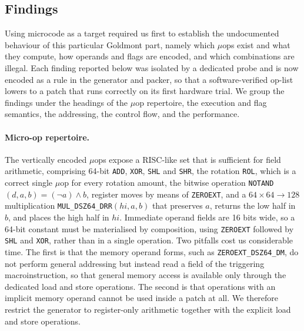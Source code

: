 \subsection{Findings}
\label{sec:findings}

Using microcode as a target required us first to establish the undocumented
behaviour of this particular Goldmont part, namely which $\mu$ops exist and what
they compute, how operands and flags are encoded, and which combinations are
illegal. Each finding reported below was isolated by a dedicated probe and is
now encoded as a rule in the generator and packer, so that a software-verified
op-list lowers to a patch that runs correctly on its first hardware trial. We
group the findings under the headings of the $\mu$op repertoire, the execution
and flag semantics, the addressing, the control flow, and the performance.

\paragraph{Micro-op repertoire.}
The vertically encoded $\mu$ops expose a RISC-like set that is sufficient for
field arithmetic, comprising 64-bit \texttt{ADD}, \texttt{XOR}, \texttt{SHL}
and \texttt{SHR}, the rotation \texttt{ROL}, which is a correct single $\mu$op
for every rotation amount, the bitwise operation
\texttt{NOTAND}$(d,a,b)=(\lnot a)\land b$, register moves by means of
\texttt{ZEROEXT}, and a $64\times64\rightarrow128$ multiplication
\texttt{MUL\_DSZ64\_DRR}$(hi,a,b)$ that preserves $a$, returns the low half in
$b$, and places the high half in $hi$. Immediate operand fields are 16 bits
wide, so a 64-bit constant must be materialised by composition, using
\texttt{ZEROEXT} followed by \texttt{SHL} and \texttt{XOR}, rather than in a
single operation. Two pitfalls cost us considerable time. The first is that the
memory operand forms, such as \texttt{ZEROEXT\_DSZ64\_DM}, do not perform
general addressing but instead read a field of the triggering macroinstruction,
so that general memory access is available only through the dedicated load and
store operations. The second is that operations with an implicit memory operand
cannot be used inside a patch at all. We therefore restrict the generator to
register-only arithmetic together with the explicit load and store operations.

